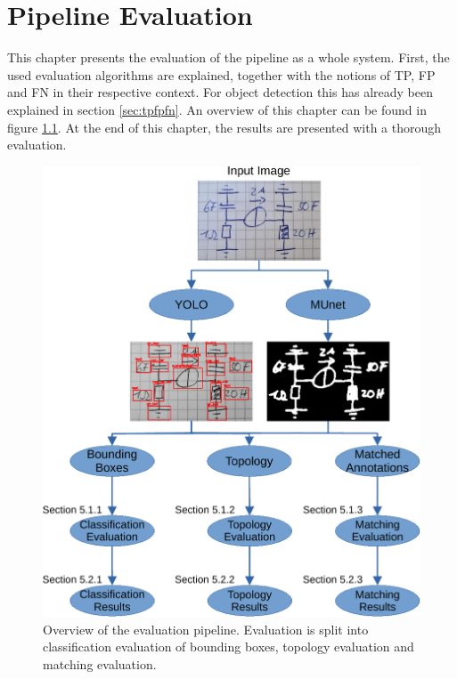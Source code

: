 \chapter{Pipeline Evaluation}

This chapter presents the evaluation of the pipeline as a whole system.
First, the used evaluation algorithms are explained, together with the notions of \ac{TP}, \ac{FP} and \ac{FN} in their respective context.
For object detection this has already been explained in section \ref{sec:tpfpfn}.
An overview of this chapter can be found in figure \ref{fig:eval_pipeline_overview}.
At the end of this chapter, the results are presented with a thorough evaluation.

\begin{figure}
\begin{center}
    \includegraphics[width=\columnwidth]{imgs/pipeline/eval_pipeline_overview_crop.pdf}
    \caption{Overview of the evaluation pipeline. Evaluation is split into classification evaluation of bounding boxes, topology evaluation and matching evaluation.}
    \label{fig:eval_pipeline_overview}
\end{center}
\end{figure}

